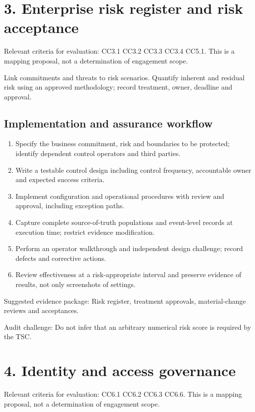 \documentclass[10pt,oneside]{report}
\begin{document}
\section{3. Enterprise risk register and risk acceptance}
Relevant criteria for evaluation: CC3.1 CC3.2 CC3.3 CC3.4 CC5.1. This is a mapping proposal, not a determination of engagement scope.

\begin{engineeringbox}
Link commitments and threats to risk scenarios. Quantify inherent and residual risk using an approved methodology; record treatment, owner, deadline and approval.
\end{engineeringbox}
\subsection{Implementation and assurance workflow}
\begin{enumerate}
\item Specify the business commitment, risk and boundaries to be protected; identify dependent control operators and third parties.
\item Write a testable control design including control frequency, accountable owner and expected success criteria.
\item Implement configuration and operational procedures with review and approval, including exception paths.
\item Capture complete source-of-truth populations and event-level records at execution time; restrict evidence modification.
\item Perform an operator walkthrough and independent design challenge; record defects and corrective actions.
\item Review effectiveness at a risk-appropriate interval and preserve evidence of results, not only screenshots of settings.
\end{enumerate}

Suggested evidence package: Risk register, treatment approvals, material-change reviews and acceptances.

Audit challenge: Do not infer that an arbitrary numerical risk score is required by the TSC.

\section{4. Identity and access governance}
Relevant criteria for evaluation: CC6.1 CC6.2 CC6.3 CC6.6. This is a mapping proposal, not a determination of engagement scope.
\end{document}
